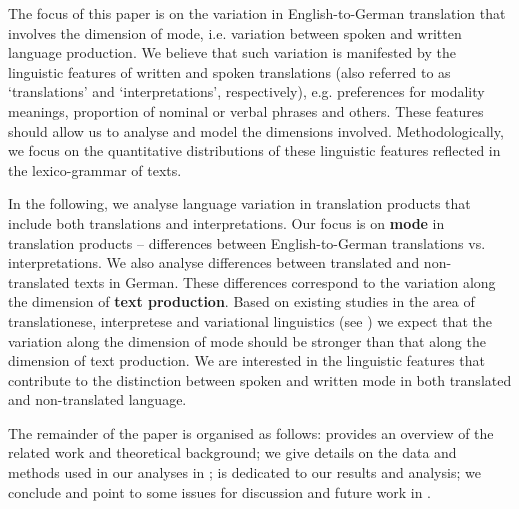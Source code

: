 \documentclass[output=paper,colorlinks,citecolor=brown]{langscibook}
\begin{document}
The focus of this paper is on the variation in English-to-German translation that
involves the dimension of mode, i.e. variation between spoken and written language production. We believe that %
such variation is %
manifested by the linguistic features of written and spoken translations (also referred to as `translations' and `interpretations', respectively), %
e.g. preferences for modality meanings, proportion of nominal or verbal phrases and others. These features should allow us to analyse and model the dimensions involved. Methodologically, we focus on the quantitative distributions of these linguistic features reflected in the lexico-grammar of texts.

In the following, we analyse language variation in translation products that include both translations and interpretations. %
Our focus is on \textbf{mode} in translation products -- differences between English-to-German translations vs. interpretations. We also analyse differences between translated and non-translated texts in German. These differences correspond to the variation along the dimension of \textbf{text production}. Based on %
existing studies in the area of translationese, interpretese and variational linguistics (see ) we expect that the variation along the dimension of mode should be stronger than that along the dimension of text production. %
We are interested in the linguistic features that contribute to the distinction between spoken and written mode in both translated and non-translated language.

The remainder of the paper is organised as follows:  provides an overview of the related work and theoretical background; we give details on the data and methods used in our analyses in ;  is dedicated to our results and analysis; we conclude and point to some issues for discussion and future work in .
\end{document}
